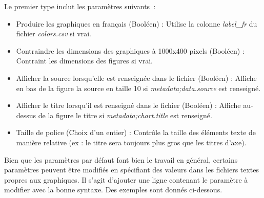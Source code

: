 \documentclass[11pt]{article}
\begin{document}
Le premier type inclut les paramètres suivants :
\begin{itemize}
    \item Produire les graphiques en français (Booléen) : Utilise la colonne \textit{label\_fr} du fichier \textit{colors.csv} si vrai.
    \item Contraindre les dimensions des graphiques à 1000x400 pixels (Booléen) : Contraint les dimensions des figures si vrai.
    \item Afficher la source lorsqu'elle est renseignée dans le fichier (Booléen) : Affiche en bas de la figure la source en taille 10 si \textit{metadata;data.source} est renseigné.
    \item Afficher le titre lorsqu'il est renseigné dans le fichier (Booléen) : Affiche au-dessus de la figure le titre si \textit{metadata;chart.title} est renseigné.
    \item Taille de police (Choix d'un entier) : Contrôle la taille des éléments texte de manière relative (ex : le titre sera toujours plus gros que les titres d'axe).
\end{itemize}
\vspace{0.2cm}
Bien que les paramètres par défaut font bien le travail en général, certains paramètres peuvent être modifiés en spécifiant des valeurs dans les fichiers textes propres aux graphiques. Il s'agit d'ajouter une ligne contenant le paramètre à modifier avec la bonne syntaxe. Des exemples sont donnés ci-dessous.
\end{document}
